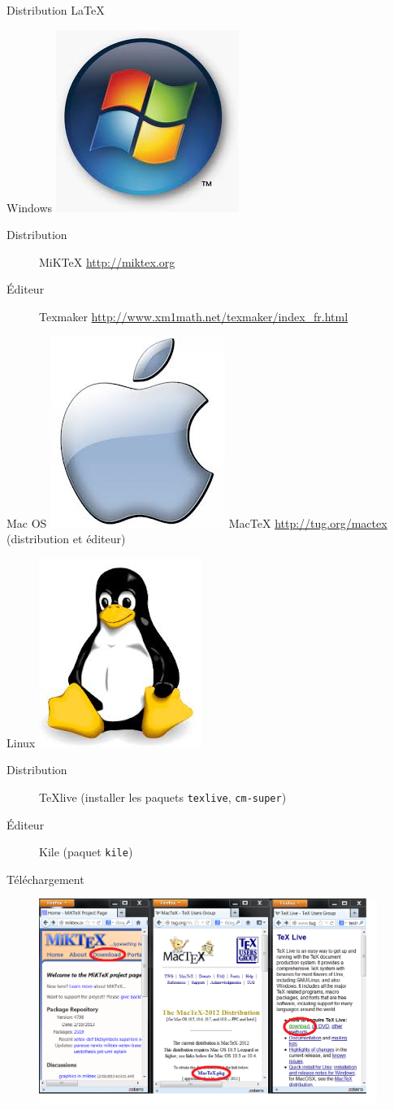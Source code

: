 \documentclass{beamer}
\begin{document}
\begin{frame}{Distribution \LaTeX}
    \begin{block}{Windows \includegraphics[width=0.6 cm]{img/logo_win7} }
        \begin{description}
            \item[Distribution] MiK\TeX{} \url{http://miktex.org}
            \item[Éditeur] Texmaker \url{http://www.xm1math.net/texmaker/index_fr.html}
        \end{description}
    \end{block}
    \begin{block}{Mac OS \includegraphics[width=0.6 cm]{img/logo_apple} }
        Mac\TeX{} \url{http://tug.org/mactex} (distribution et éditeur)
    \end{block}
    \begin{block}{Linux \includegraphics[width=0.6 cm]{img/logo_linux}}
        \begin{description}
            \item[Distribution] TeXlive (installer les paquets \texttt{texlive}, \texttt{cm-super})
            \item[Éditeur] Kile (paquet \texttt{kile})
        \end{description}
    \end{block}
\end{frame}


\begin{frame}{Téléchargement}

   \begin{figure} %
\centering %
\includegraphics[width=11cm]{img/fenetre_moz_log} %
\end{figure} %

\end{frame}
\end{document}
